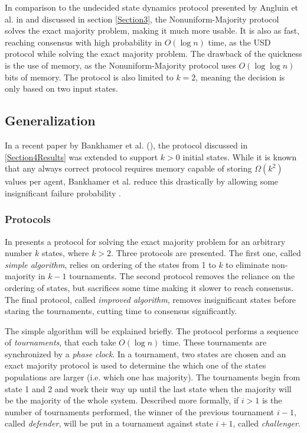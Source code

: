 In comparison to the undecided state dynamics protocol presented by Angluin et al. in \cite{angluinSimplePopulationProtocol2008} and discussed in section \ref{Section3}, the Nonuniform-Majority protocol solves the exact majority problem, making it much more usable. It is also as fast, reaching consensus with high probability in $O(\log n)$ time, as the USD protocol while solving the exact majority problem. The drawback of the quickness is the use of memory, as the Nonuniform-Majority protocol uses $O(\log \log n)$ bits of memory.  The protocol is also limited to $k = 2$, meaning the decision is only based on two input states. 

\subsection{Generalization}

In a recent paper by Bankhamer et al. (\cite{bankhamerPopulationProtocolsExact2022}), the protocol discussed in \ref{Section4Results} was extended to support $k > 0$ initial states. While it is known that any always correct protocol requires memory capable of storing $\Omega(k^2)$ values per agent, Bankhamer et al. reduce this drastically by allowing some insignificant failure probability \cite{ongaroSearchUnderstandableConsensus}. 

\subsubsection{Protocols} \label{441}

In \cite{bankhamerPopulationProtocolsExact2022} presents a protocol for solving the exact majority problem for an arbitrary number $k$ states, where $k > 2$. Three protocols are presented. The first one, called \emph{simple algorithm}, relies on ordering of the states from 1 to $k$ to eliminate non-majority in $k-1$ tournaments. The second protocol removes the reliance on the ordering of states, but sacrifices some time making it slower to reach consensus. The final protocol, called \emph{improved algorithm}, removes insignificant states before staring the tournaments, cutting time to consensus significantly. 

The simple algorithm will be explained briefly. The protocol performs a sequence of \emph{tournaments}, that each take $O(\log n)$ time. These tournaments are synchronized by a \emph{phase clock}. In a tournament, two states are chosen and an exact majority protocol is used to determine the which one of the states populations are larger (i.e. which one has majority). The tournaments begin from state 1 and 2 and work their way up until the last state when the majority will be the majority of the whole system. Described more formally, if $i > 1$ is the number of tournaments performed, the winner of the previous tournament $i - 1$, called \emph{defender}, will be put in a tournament against state $i + 1$, called \emph{challenger}. 

